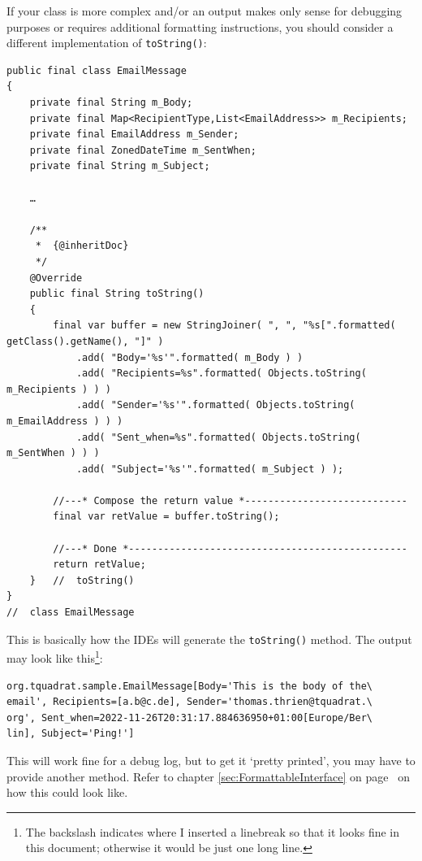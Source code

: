 \documentclass[11pt,a4paper, titlepage, parskip=half, headsepline, footsepline, cleardoublepage=current, headheight=1cm]{scrbook}
\newcommand*{\tqvref}[1]{\hyperref[{#1}]{\ref*{#1}} on page~\pageref{#1}}
\begin{document}
If your class is more complex and/or an output makes only sense for debugging purposes or requires additional formatting instructions, you should consider a different implementation of \lstinline|toString()|:
\begin{lstlisting}
public final class EmailMessage
{
    private final String m_Body;
    private final Map<RecipientType,List<EmailAddress>> m_Recipients;
    private final EmailAddress m_Sender;
    private final ZonedDateTime m_SentWhen;
    private final String m_Subject;
    
    …
    
    /**
     *  {@inheritDoc}
     */
    @Override 
    public final String toString()
    {
        final var buffer = new StringJoiner( ", ", "%s[".formatted( getClass().getName(), "]" )
            .add( "Body='%s'".formatted( m_Body ) )
            .add( "Recipients=%s".formatted( Objects.toString( m_Recipients ) ) )
            .add( "Sender='%s'".formatted( Objects.toString( m_EmailAddress ) ) )
            .add( "Sent_when=%s".formatted( Objects.toString( m_SentWhen ) ) )
            .add( "Subject='%s'".formatted( m_Subject ) );
            
        //---* Compose the return value *----------------------------    
        final var retValue = buffer.toString();
        
        //---* Done *------------------------------------------------
        return retValue;
    }   //  toString()
}
//  class EmailMessage
\end{lstlisting}

This is basically how the IDEs will generate the \lstinline|toString()| method. The output may look like this\footnote{The backslash indicates where I inserted a linebreak so that it looks fine in this document; otherwise it would be just one long line.}:
\begin{verbatim}
org.tquadrat.sample.EmailMessage[Body='This is the body of the\
email', Recipients=[a.b@c.de], Sender='thomas.thrien@tquadrat.\
org', Sent_when=2022-11-26T20:31:17.884636950+01:00[Europe/Ber\
lin], Subject='Ping!']
\end{verbatim}

This will work fine for a debug log, but to get it ‘pretty printed’, you may have to provide another method. Refer to chapter \tqvref{sec:FormattableInterface} on how
this could look like.
\end{document}
